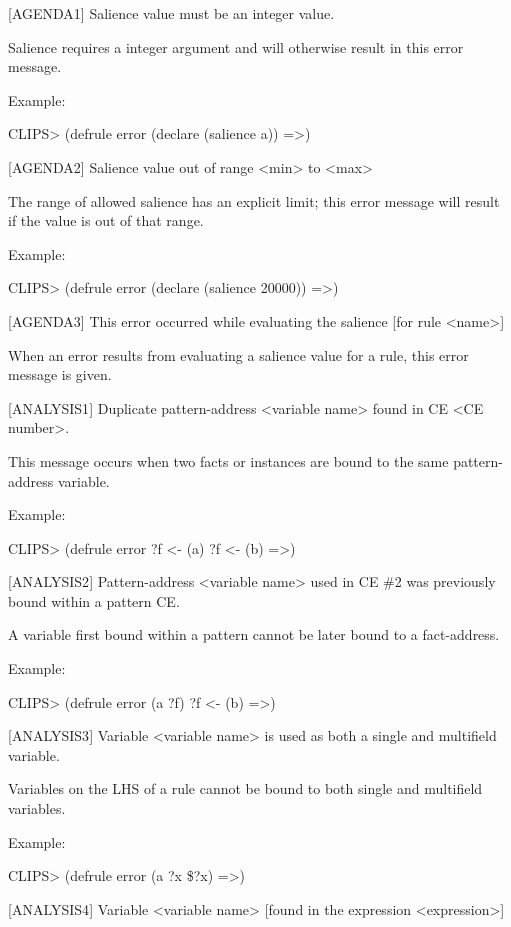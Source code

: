 \documentclass[letterpaper,10pt,english]{sphinxmanual}
\begin{document}
{[}AGENDA1{]} Salience value must be an integer value.

Salience requires a integer argument and will otherwise result in this
error message.

Example:

CLIPS\textgreater{} (defrule error (declare (salience a)) =\textgreater{})

{[}AGENDA2{]} Salience value out of range \textless{}min\textgreater{} to \textless{}max\textgreater{}

The range of allowed salience has an explicit limit; this error message
will result if the value is out of that range.

Example:

CLIPS\textgreater{} (defrule error (declare (salience 20000)) =\textgreater{})

{[}AGENDA3{]} This error occurred while evaluating the salience {[}for rule
\textless{}name\textgreater{}{]}

When an error results from evaluating a salience value for a rule, this
error message is given.

{[}ANALYSIS1{]} Duplicate pattern-address \textless{}variable name\textgreater{} found in CE \textless{}CE
number\textgreater{}.

This message occurs when two facts or instances are bound to the same
pattern-address variable.

Example:

CLIPS\textgreater{} (defrule error ?f \textless{}- (a) ?f \textless{}- (b) =\textgreater{})

{[}ANALYSIS2{]} Pattern-address \textless{}variable name\textgreater{} used in CE \#2 was previously
bound within a pattern CE.

A variable first bound within a pattern cannot be later bound to a
fact-address.

Example:

CLIPS\textgreater{} (defrule error (a ?f) ?f \textless{}- (b) =\textgreater{})

{[}ANALYSIS3{]} Variable \textless{}variable name\textgreater{} is used as both a single and
multifield variable.

Variables on the LHS of a rule cannot be bound to both single and
multifield variables.

Example:

CLIPS\textgreater{} (defrule error (a ?x \$?x) =\textgreater{})

{[}ANALYSIS4{]} Variable \textless{}variable name\textgreater{} {[}found in the expression
\textless{}expression\textgreater{}{]}
\end{document}
